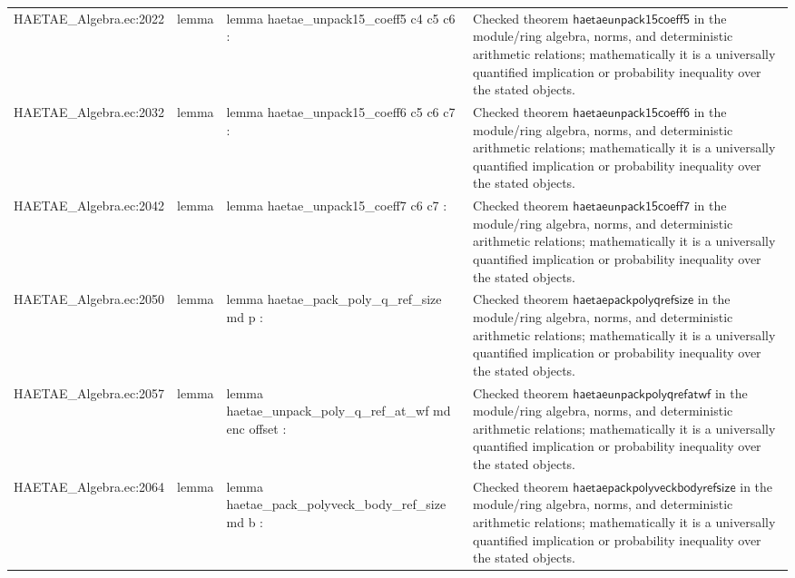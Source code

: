 \documentclass[10pt]{article}
\begin{document}
\begin{longtable}{L{0.11\textwidth}L{0.055\textwidth}L{0.385\textwidth}L{0.41\textwidth}}
HAETAE\_\allowbreak{}Algebra.\allowbreak{}ec:\allowbreak{}2022 & lemma & {\ttfamily\scriptsize lemma haetae\_\allowbreak{}unpack15\_\allowbreak{}coeff5 c4 c5 c6 :} & Checked theorem $\mathsf{haetaeunpack15coeff5}$ in the module/ring algebra, norms, and deterministic arithmetic relations; mathematically it is a universally quantified implication or probability inequality over the stated objects. \\
HAETAE\_\allowbreak{}Algebra.\allowbreak{}ec:\allowbreak{}2032 & lemma & {\ttfamily\scriptsize lemma haetae\_\allowbreak{}unpack15\_\allowbreak{}coeff6 c5 c6 c7 :} & Checked theorem $\mathsf{haetaeunpack15coeff6}$ in the module/ring algebra, norms, and deterministic arithmetic relations; mathematically it is a universally quantified implication or probability inequality over the stated objects. \\
HAETAE\_\allowbreak{}Algebra.\allowbreak{}ec:\allowbreak{}2042 & lemma & {\ttfamily\scriptsize lemma haetae\_\allowbreak{}unpack15\_\allowbreak{}coeff7 c6 c7 :} & Checked theorem $\mathsf{haetaeunpack15coeff7}$ in the module/ring algebra, norms, and deterministic arithmetic relations; mathematically it is a universally quantified implication or probability inequality over the stated objects. \\
HAETAE\_\allowbreak{}Algebra.\allowbreak{}ec:\allowbreak{}2050 & lemma & {\ttfamily\scriptsize lemma haetae\_\allowbreak{}pack\_\allowbreak{}poly\_\allowbreak{}q\_\allowbreak{}ref\_\allowbreak{}size md p :} & Checked theorem $\mathsf{haetaepackpolyqrefsize}$ in the module/ring algebra, norms, and deterministic arithmetic relations; mathematically it is a universally quantified implication or probability inequality over the stated objects. \\
HAETAE\_\allowbreak{}Algebra.\allowbreak{}ec:\allowbreak{}2057 & lemma & {\ttfamily\scriptsize lemma haetae\_\allowbreak{}unpack\_\allowbreak{}poly\_\allowbreak{}q\_\allowbreak{}ref\_\allowbreak{}at\_\allowbreak{}wf md enc offset :} & Checked theorem $\mathsf{haetaeunpackpolyqrefatwf}$ in the module/ring algebra, norms, and deterministic arithmetic relations; mathematically it is a universally quantified implication or probability inequality over the stated objects. \\
HAETAE\_\allowbreak{}Algebra.\allowbreak{}ec:\allowbreak{}2064 & lemma & {\ttfamily\scriptsize lemma haetae\_\allowbreak{}pack\_\allowbreak{}polyveck\_\allowbreak{}body\_\allowbreak{}ref\_\allowbreak{}size md b :} & Checked theorem $\mathsf{haetaepackpolyveckbodyrefsize}$ in the module/ring algebra, norms, and deterministic arithmetic relations; mathematically it is a universally quantified implication or probability inequality over the stated objects. \\

\end{longtable}
\end{document}
